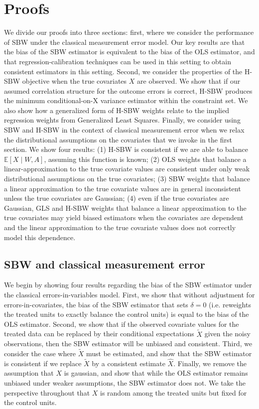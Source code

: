 \section{Proofs}\label{ssec:proof}

We divide our proofs into three sections: first, where we consider the performance of SBW under the classical measurement error model. Our key results are that the bias of the SBW estimator is equivalent to the bias of the OLS estimator, and that regression-calibration techniques can be used in this setting to obtain consistent estimators in this setting. Second, we consider the properties of the H-SBW objective when the true covariates $X$ are observed. We show that if our assumed correlation structure for the outcome errors is correct, H-SBW produces the minimum conditional-on-X variance estimator within the constraint set. We also show how a generalized form of H-SBW weights relate to the implied regression weights from Generalized Least Squares. Finally, we consider using SBW and H-SBW in the context of classical measurement error when we relax the distributional assumptions on the covariates that we invoke in the first section. We show four results: (1) H-SBW is consistent if we are able to balance $\mathbb{E}[X \mid W, A]$, assuming this function is known; (2) OLS weights that balance a linear-approximation to the true covariate values are consistent under only weak distributional assumptions on the true covariates; (3) SBW weights that balance a linear approximation to the true covariate values are in general inconsistent unless the true covariates are Gaussian; (4) even if the true covariates are Gaussian, GLS and H-SBW weights that balance a linear approximation to the true covariates may yield biased estimators when the covariates are dependent and the linear approximation to the true covariate values does not correctly model this dependence.

\subsection{SBW and classical measurement error}\label{app:AsecI}

We begin by showing four results regarding the bias of the SBW estimator under the classical errors-in-variables model. First, we show that without adjustment for errors-in-covariates, the bias of the SBW estimator that sets $\delta = 0$ (i.e. reweights the treated units to exactly balance the control units) is equal to the bias of the OLS estimator. Second, we show that if the observed covariate values for the treated data can be replaced by their conditional expectations $\tilde{X}$ given the noisy observations, then the SBW estimator will be unbiased and consistent. Third, we consider the case where $\tilde{X}$ must be estimated, and show that the SBW estimator is consistent if we replace $\tilde{X}$ by a consistent estimate $\hat{X}$. Finally, we remove the assumption that $X$ is gaussian, and show that while the OLS estimator remains unbiased under weaker assumptions, the SBW estimator does not. We take the perspective throughout that $X$ is random among the treated units but fixed for the control units.

